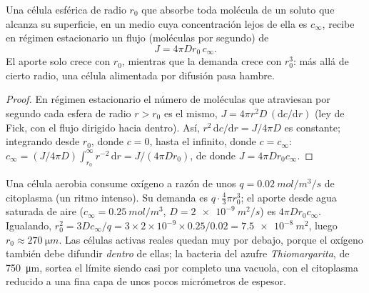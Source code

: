 \begin{theorem}\label{thm:b2:unicellular-diversity:supply}
Una célula esférica de radio $r_0$ que absorbe toda molécula de un
soluto que alcanza su superficie, en un medio cuya concentración lejos
de ella es $c_\infty$, recibe en régimen estacionario un flujo (moléculas
por segundo) de
\[
J = 4\pi D r_0\, c_\infty .
\]
El aporte solo crece con $r_0$, mientras que la demanda crece con
$r_0^3$: más allá de cierto radio, una célula alimentada por difusión
pasa hambre.
\end{theorem}
\begin{proof}
En régimen estacionario el número de moléculas que atraviesan por
segundo cada esfera de radio $r > r_0$ es el mismo, $J = 4\pi r^2 D\,
(\mathrm{d}c/\mathrm{d}r)$ (ley de Fick, con el flujo dirigido hacia dentro).
Así, $r^2\,\mathrm{d}c/\mathrm{d}r = J/4\pi D$ es constante; integrando
desde $r_0$, donde $c = 0$, hasta el infinito, donde $c = c_\infty$:
$c_\infty = (J/4\pi D)\int_{r_0}^{\infty} r^{-2}\,\mathrm{d}r =
J/(4\pi D r_0)$, de donde $J = 4\pi D r_0 c_\infty$.
\end{proof}

\begin{example}\label{ex:b2:unicellular-diversity:howbig}
Una célula aerobia consume oxígeno a razón de unos $q = \qty{0.02}{mol/m^3/s}$
de citoplasma (un ritmo intenso). Su demanda es $q \cdot \tfrac{4}{3}\pi
r_0^3$; el aporte desde agua saturada de aire ($c_\infty =
\qty{0.25}{mol/m^3}$, $D = \qty{2e-9}{m^2/s}$) es $4\pi D r_0
c_\infty$. Igualando, $r_0^2 = 3Dc_\infty/q = 3\times 2\times 10^{-9}
\times 0.25/0.02 = \qty{7.5e-8}{m^2}$, luego $r_0 \approx
\qty{270}{\micro m}$. Las células activas reales quedan muy por debajo,
porque el oxígeno también debe difundir \emph{dentro} de ellas; la
bacteria del azufre \emph{Thiomargarita}, de \qty{750}{\micro m}, sortea
el límite siendo casi por completo una vacuola, con el citoplasma
reducido a una fina capa de unos pocos micrómetros de espesor.
\end{example}

